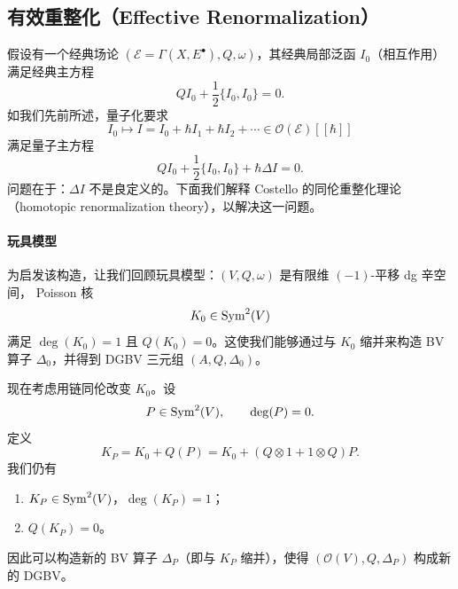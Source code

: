 

\subsection{有效重整化（Effective Renormalization）}

假设有一个经典场论 $(\mathcal{E}=\Gamma(X,E^{\bullet}),Q,\omega)$，其经典局部泛函
$I_0$（相互作用）满足经典主方程
\[
  QI_0+\frac{1}{2}\{I_0,I_0\}=0.
\]
如我们先前所述，量子化要求
\[
  I_0\longmapsto I=I_0+\hbar I_1+\hbar I_2+\cdots
  \in\mathcal{O}(\mathcal{E})[[\hbar]]
\]
满足量子主方程
\[
  QI_0+\frac{1}{2}\{I_0,I_0\}+\hbar\Delta I=0.
\]
问题在于：$\Delta I$ 不是良定义的。下面我们解释 Costello 的同伦重整化理论
（homotopic renormalization theory），以解决这一问题。


\paragraph{玩具模型}

为启发该构造，让我们回顾玩具模型：$(V,Q,\omega)$ 是有限维 $(-1)$-平移 dg 辛空间，
Poisson 核
\[
  K_0\in\operatorname{Sym}^2(V)
\]
满足 $\deg(K_0)=1$ 且 $Q(K_0)=0$。这使我们能够通过与 $K_0$ 缩并来构造 BV 算子
$\Delta_0$，并得到 DGBV 三元组 $(A,Q,\Delta_0)$。

现在考虑用链同伦改变 $K_0$。设
\[
  P\in\operatorname{Sym}^2(V),\qquad \deg(P)=0.
\]
定义
\[
  K_P=K_0+Q(P)=K_0+(Q\otimes1+1\otimes Q)P.
\]
我们仍有
\begin{enumerate}[label=\textcircled{\small\arabic*},leftmargin=2.4em,itemsep=0.15em]
  \item $K_P\in\operatorname{Sym}^2(V)$，$\deg(K_P)=1$；
  \item $Q(K_P)=0$。
\end{enumerate}
因此可以构造新的 BV 算子 $\Delta_P$（即与 $K_P$ 缩并），使得
$(\mathcal{O}(V),Q,\Delta_P)$ 构成新的 DGBV。

